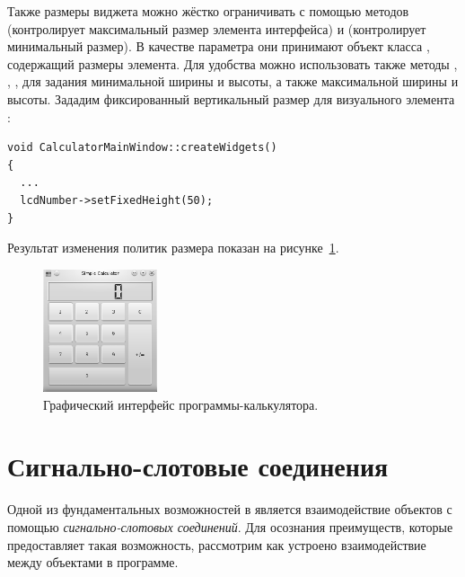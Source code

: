 Также размеры виджета можно жёстко ограничивать с помощью методов
 (контролирует максимальный размер элемента интерфейса) и 
(контролирует минимальный размер). В качестве параметра они принимают объект класса ,
содержащий размеры элемента. Для удобства можно использовать также методы ,
, ,  для задания минимальной ширины и
высоты, а также максимальной ширины и высоты. Зададим фиксированный вертикальный размер для визуального элемента
:
\begin{lstlisting}
void CalculatorMainWindow::createWidgets()
{
  ...
  lcdNumber->setFixedHeight(50);
}
\end{lstlisting}

Результат изменения политик размера показан на рисунке~\ref{ch13:refDrawing5}.
\begin{figure}[htb]
\begin{center}
\includegraphics[width=0.3\textwidth]{img/ris_13_6}
\caption{Графический интерфейс программы-калькулятора.}
\label{ch13:refDrawing5}
\end{center}
\end{figure}

\section[Сигнально-слотовые соединения]{Сигнально-слотовые соединения}
Одной из фундаментальных возможностей в  является взаимодействие объектов с помощью \emph{сигнально-слотовых
соединений}. Для осознания преимуществ, которые предоставляет такая  возможность, рассмотрим как устроено
взаимодействие между объектами в программе.

